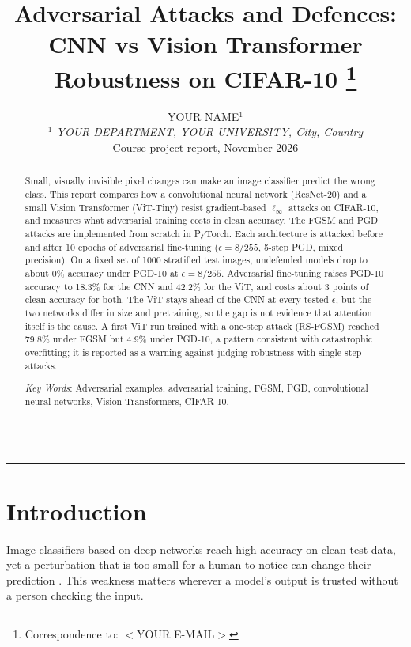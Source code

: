 \documentclass[a4paper,11pt]{article}
\title{\fontsize{16}{20}\selectfont\bfseries Adversarial Attacks and Defences:
CNN vs Vision Transformer Robustness on CIFAR-10%
\thanks{Correspondence to: $<$YOUR E-MAIL$>$}}
\author{YOUR NAME$^{1}$ \\[3mm]
{\small\itshape $^{1}$ YOUR DEPARTMENT, YOUR UNIVERSITY, City, Country} \\[3mm]
{\small Course project report, November 2026}}
\date{}
\begin{document}
\maketitle

\noindent\rule{\textwidth}{0.4pt}

\begin{abstract}

Small, visually invisible pixel changes can make an image classifier
predict the wrong class. This report compares how a convolutional
neural network (ResNet-20) and a small Vision Transformer (ViT-Tiny)
resist gradient-based $\ell_\infty$ attacks on CIFAR-10, and measures what
adversarial training costs in clean accuracy.
The FGSM and PGD attacks are implemented from scratch in PyTorch. Each
architecture is attacked before and after 10 epochs of adversarial
fine-tuning ($\epsilon = 8/255$, 5-step PGD, mixed precision). On a
fixed set of 1000 stratified test images, undefended models drop to
about 0\% accuracy under PGD-10 at $\epsilon = 8/255$. Adversarial
fine-tuning raises PGD-10 accuracy to 18.3\% for the CNN and 42.2\% for
the ViT, and costs about 3 points of clean accuracy for both. The ViT
stays ahead of the CNN at every tested $\epsilon$, but the two networks
differ in size and pretraining, so the gap is not evidence that attention
itself is the cause. A first ViT run trained with a one-step attack
(RS-FGSM) reached 79.8\% under FGSM but 4.9\% under PGD-10, a pattern
consistent with catastrophic overfitting; it is reported as a warning
against judging robustness with single-step attacks.

\vspace{0.5cm}
\noindent
{\em Key Words}: Adversarial examples, adversarial training, FGSM, PGD,
convolutional neural networks, Vision Transformers, CIFAR-10.

\end{abstract}
\noindent\rule{\textwidth}{0.4pt}\par

\section{Introduction}

Image classifiers based on deep networks reach high accuracy on clean
test data, yet a perturbation that is too small for a human to notice can
change their prediction \cite{Szegedy:14,Goodfellow:15}. This weakness
matters wherever a model's output is trusted without a person checking
the input.
\end{document}
